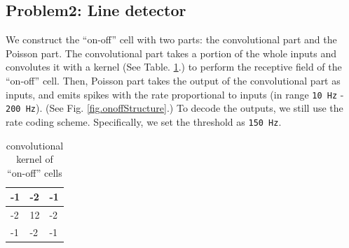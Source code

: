 \documentclass[11pt]{article}
\begin{document}
\subsection*{Problem2: Line detector}
    We construct the ``on-off'' cell with two parts: the convolutional part and the Poisson part. The convolutional part takes a portion of the whole inputs and convolutes it with a kernel (See Table. \ref{table.onoffKernel}.) to perform the receptive field of the ``on-off'' cell. Then, Poisson part takes the output of the convolutional part as inputs, and emits spikes with the rate proportional to inputs (in range \texttt{10 Hz} - \texttt{200 Hz}). (See Fig. \ref{fig.onoffStructure}.)  To decode the outputs, we still use the rate coding scheme. Specifically, we set the threshold as \texttt{150 Hz}.
    
    \begin{table}[htbp]
    \centering
        \begin{tabular}{|l|l|l|}
        \hline
        -1 & -2 & -1 \\ \hline
        -2 & 12 & -2 \\ \hline
        -1 & -2 & -1 \\ \hline
        \end{tabular}
        \caption{convolutional kernel of ``on-off'' cells}
        \label{table.onoffKernel}
    \end{table}
\end{document}
